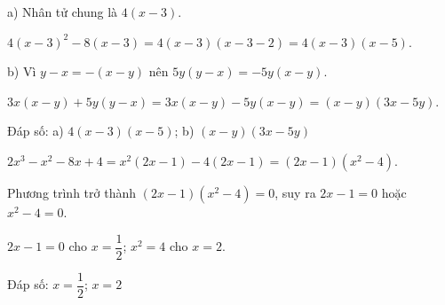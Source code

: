 \begin{problem}[8DS-PTNT-011]
a) Nhân tử chung là $4(x - 3)$.

$4(x - 3)^2 - 8(x - 3) = 4(x - 3)(x - 3 - 2) = 4(x - 3)(x - 5)$.

b) Vì $y - x = -(x - y)$ nên $5y(y - x) = -5y(x - y)$.

$3x(x - y) + 5y(y - x) = 3x(x - y) - 5y(x - y) = (x - y)(3x - 5y)$.

Đáp số: a) $4(x - 3)(x - 5)$; b) $(x - y)(3x - 5y)$
\end{problem}

\begin{problem}[8DS-PTNT-007]
$2x^3 - x^2 - 8x + 4 = x^2(2x - 1) - 4(2x - 1) = (2x - 1)(x^2 - 4)$.

Phương trình trở thành $(2x - 1)(x^2 - 4) = 0$, suy ra $2x - 1 = 0$ hoặc $x^2 - 4 = 0$.

$2x - 1 = 0$ cho $x = \dfrac{1}{2}$; $x^2 = 4$ cho $x = 2$.

Đáp số: $x = \dfrac{1}{2}$; $x = 2$
\end{problem}
